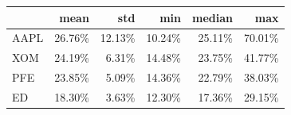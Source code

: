 \begin{tabular}{lrrrrr}
\toprule
 & mean & std & min & median & max \\
\midrule
AAPL & 26.76\% & 12.13\% & 10.24\% & 25.11\% & 70.01\% \\
XOM & 24.19\% & 6.31\% & 14.48\% & 23.75\% & 41.77\% \\
PFE & 23.85\% & 5.09\% & 14.36\% & 22.79\% & 38.03\% \\
ED & 18.30\% & 3.63\% & 12.30\% & 17.36\% & 29.15\% \\
\bottomrule
\end{tabular}
